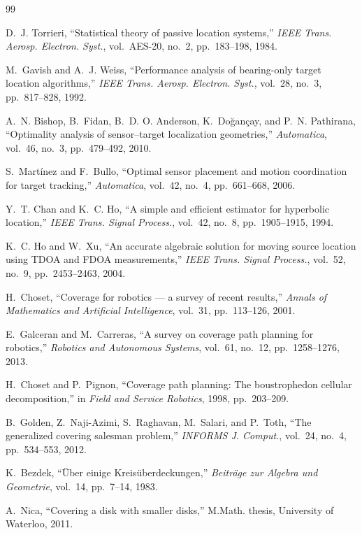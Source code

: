 \documentclass[preprint,12pt,3p]{elsarticle}
\theoremstyle{definition}
\begin{document}
\begin{thebibliography}{99}

D.~J. Torrieri, ``Statistical theory of passive location systems,''
\emph{IEEE Trans. Aerosp. Electron. Syst.}, vol.~AES-20, no.~2, pp.~183--198, 1984.

M.~Gavish and A.~J. Weiss, ``Performance analysis of bearing-only target location algorithms,''
\emph{IEEE Trans. Aerosp. Electron. Syst.}, vol.~28, no.~3, pp.~817--828, 1992.

A.~N. Bishop, B.~Fidan, B.~D. O. Anderson, K.~Do\u{g}an\c{c}ay, and P.~N. Pathirana,
``Optimality analysis of sensor--target localization geometries,''
\emph{Automatica}, vol.~46, no.~3, pp.~479--492, 2010.

S.~Mart\'inez and F.~Bullo, ``Optimal sensor placement and motion coordination for target
tracking,'' \emph{Automatica}, vol.~42, no.~4, pp.~661--668, 2006.

Y.~T. Chan and K.~C. Ho, ``A simple and efficient estimator for hyperbolic location,''
\emph{IEEE Trans. Signal Process.}, vol.~42, no.~8, pp.~1905--1915, 1994.

K.~C. Ho and W.~Xu, ``An accurate algebraic solution for moving source location using TDOA and
FDOA measurements,'' \emph{IEEE Trans. Signal Process.}, vol.~52, no.~9, pp.~2453--2463, 2004.

H.~Choset, ``Coverage for robotics --- a survey of recent results,''
\emph{Annals of Mathematics and Artificial Intelligence}, vol.~31, pp.~113--126, 2001.

E.~Galceran and M.~Carreras, ``A survey on coverage path planning for robotics,''
\emph{Robotics and Autonomous Systems}, vol.~61, no.~12, pp.~1258--1276, 2013.

H.~Choset and P.~Pignon, ``Coverage path planning: The boustrophedon cellular decomposition,''
in \emph{Field and Service Robotics}, 1998, pp.~203--209.

B.~Golden, Z.~Naji-Azimi, S.~Raghavan, M.~Salari, and P.~Toth, ``The generalized covering
salesman problem,'' \emph{INFORMS J. Comput.}, vol.~24, no.~4, pp.~534--553, 2012.

K.~Bezdek, ``\"Uber einige Kreis\"uberdeckungen,'' \emph{Beitr\"age zur Algebra und Geometrie},
vol.~14, pp.~7--14, 1983.

A.~Nica, ``Covering a disk with smaller disks,'' M.Math. thesis, University of Waterloo, 2011.


\end{thebibliography}
\end{document}
